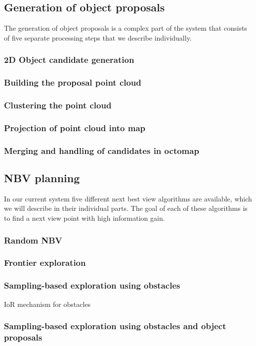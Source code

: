 \documentclass[a4paper,11pt,english]{article}
\begin{document}
\subsection{Generation of object proposals}
The generation of object proposals is a complex part of the system that consists of five separate processing steps that we describe individually.

\subsubsection{2D Object candidate generation}
\subsubsection{Building the proposal point cloud}
\subsubsection{Clustering the point cloud}
\subsubsection{Projection of point cloud into map}
\subsubsection{Merging and handling of candidates in octomap}

\subsection{NBV planning}
In our current system five different next best view algorithms are available, which we will describe in their individual parts.
The goal of each of these algorithms is to find a next view point with high information gain.

\subsubsection{Random NBV}
\subsubsection{Frontier exploration}
\subsubsection{Sampling-based exploration using obstacles}
IoR mechanism for obstacles
\subsubsection{Sampling-based exploration using obstacles and object proposals}
\end{document}
